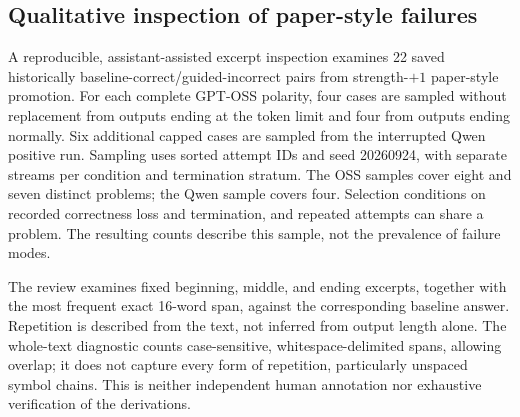 \subsection{Qualitative inspection of paper-style failures}
\label{sec:paper-failure-inspection}

A reproducible, assistant-assisted excerpt inspection examines 22 saved
historically baseline-correct/guided-incorrect pairs from strength-$+1$ paper-style
promotion. For each complete GPT-OSS polarity, four cases are sampled
without replacement from outputs ending at the token limit and four from
outputs ending normally. Six additional capped cases are sampled from the
interrupted Qwen positive run. Sampling uses sorted attempt IDs and seed
20260924, with separate streams per condition and termination stratum.
The OSS samples cover eight and seven distinct problems; the Qwen sample
covers four. Selection conditions on recorded correctness loss and
termination, and repeated attempts can share a problem. The resulting
counts describe this sample, not the prevalence of failure modes.

The review examines fixed beginning, middle, and ending excerpts, together
with the most frequent exact 16-word span, against the corresponding
baseline answer. Repetition is described from the text, not inferred from
output length alone. The whole-text diagnostic counts case-sensitive,
whitespace-delimited spans, allowing overlap; it does not capture every
form of repetition, particularly unspaced symbol chains. This is neither
independent human annotation nor exhaustive verification of the derivations.

\begin{table}[htbp]
\centering\small
\caption{Descriptions of 22 cases sampled as correctness losses under the original scorer. Capped/stopped gives the sampled termination strata. Repetition can coexist with mathematical errors; the arithmetic-error column describes the remaining case without an observed long cycle. Formatting disagreement denotes an equivalent final answer rejected by the saved scorer. Counts are conditional on the sampling design.}
\label{tab:paper-failure-review}
\end{table}

